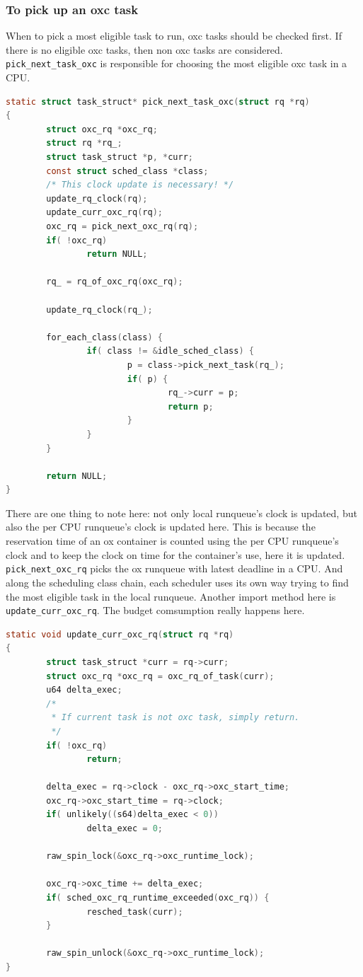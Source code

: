 \subsubsection{To pick up an oxc task}
When to pick a most eligible task to run, oxc tasks should be checked first.
If there is no eligible oxc tasks, then non oxc tasks are considered.
\texttt{pick\_next\_task\_oxc} is responsible for choosing the most 
eligible oxc task in a CPU.
\begin{lstlisting}[language=C]
static struct task_struct* pick_next_task_oxc(struct rq *rq)
{
        struct oxc_rq *oxc_rq;
        struct rq *rq_;
        struct task_struct *p, *curr;
        const struct sched_class *class;
        /* This clock update is necessary! */
        update_rq_clock(rq);
        update_curr_oxc_rq(rq);
        oxc_rq = pick_next_oxc_rq(rq);
        if( !oxc_rq)
                return NULL;

        rq_ = rq_of_oxc_rq(oxc_rq);

        update_rq_clock(rq_);

        for_each_class(class) {
                if( class != &idle_sched_class) {
                        p = class->pick_next_task(rq_);
                        if( p) {
                                rq_->curr = p;
                                return p;
                        }
                }
        }

        return NULL;
}
\end{lstlisting}
There are one thing to note here: not only local runqueue's clock
is updated, but also the per CPU runqueue's clock is updated here.
This is because the reservation time of an ox container is counted
using the per CPU runqueue's clock and to keep the clock on time
for the container's use, here it is updated. 
\texttt{pick\_next\_oxc\_rq} picks the ox runqueue with latest 
deadline in a CPU. And along the scheduling class chain, each
scheduler uses its own way trying to find the most eligible
task in the local runqueue.
Another import method here is \texttt{update\_curr\_oxc\_rq}.
The budget comsumption really happens here.
\begin{lstlisting}[language=C]
static void update_curr_oxc_rq(struct rq *rq)
{
        struct task_struct *curr = rq->curr;
        struct oxc_rq *oxc_rq = oxc_rq_of_task(curr);
        u64 delta_exec;
        /*
         * If current task is not oxc task, simply return.
         */
        if( !oxc_rq)
                return;

        delta_exec = rq->clock - oxc_rq->oxc_start_time;
        oxc_rq->oxc_start_time = rq->clock;
        if( unlikely((s64)delta_exec < 0))
                delta_exec = 0;

        raw_spin_lock(&oxc_rq->oxc_runtime_lock);

        oxc_rq->oxc_time += delta_exec;
        if( sched_oxc_rq_runtime_exceeded(oxc_rq)) {
                resched_task(curr);
        }

        raw_spin_unlock(&oxc_rq->oxc_runtime_lock);
}
\end{lstlisting}
